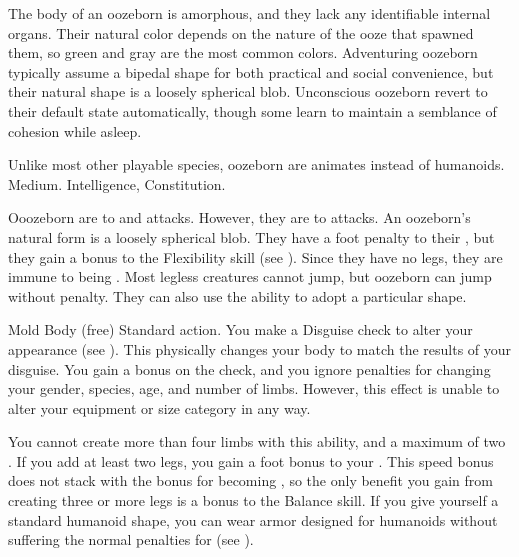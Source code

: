   The body of an oozeborn is amorphous, and they lack any identifiable internal organs.
  Their natural color depends on the nature of the ooze that spawned them, so green and gray are the most common colors.
  Adventuring oozeborn typically assume a bipedal shape for both practical and social convenience, but their natural shape is a loosely spherical blob.
  Unconscious oozeborn revert to their default state automatically, though some learn to maintain a semblance of cohesion while asleep.

   Unlike most other playable species, oozeborn are animates instead of humanoids.
   Medium.
    Intelligence,  Constitution.
  \begin{raggeditemize}
     Ooozeborn are  to \atAcid and \atPoison attacks. However, they are  to \atEarth attacks.
     An oozeborn's natural form is a loosely spherical blob.
      They have a  foot penalty to their , but they gain a  bonus to the Flexibility skill (see ).
      Since they have no legs, they are immune to being \prone.
      Most legless creatures cannot jump, but oozeborn can jump without penalty.
      They can also use the  ability to adopt a particular shape.
      \begin{sustainability}{Mold Body}{ (free)}
        \abilityusagetime Standard action.
        \rankline
        You make a Disguise check to alter your appearance (see ).
        This physically changes your body to match the results of your disguise.
        You gain a  bonus on the check, and you ignore penalties for changing your gender, species, age, and number of limbs.
        However, this effect is unable to alter your equipment or size category in any way.

        You cannot create more than four limbs with this ability, and a maximum of two .
        If you add at least two legs, you gain a  foot bonus to your .
        This speed bonus does not stack with the bonus for becoming , so the only benefit you gain from creating three or more legs is a  bonus to the Balance skill.
        If you give yourself a standard humanoid shape, you can wear armor designed for humanoids without suffering the normal penalties for  (see ).


\end{sustainability}
\end{raggeditemize}
